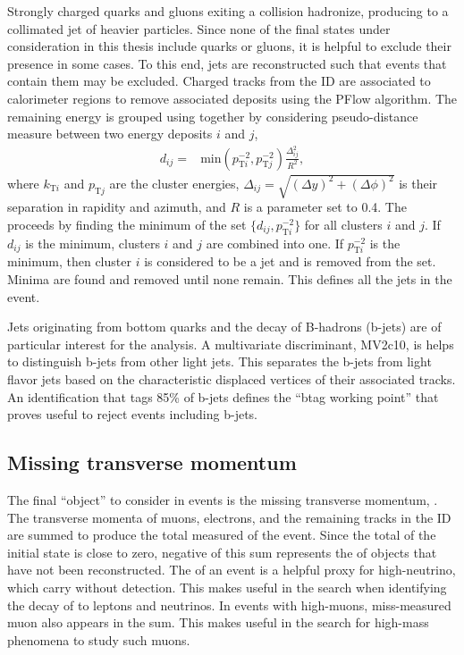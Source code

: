 Strongly charged quarks and gluons exiting a collision hadronize, producing to a collimated jet of heavier particles.
Since none of the final states under consideration in this thesis include quarks or gluons, it is helpful to exclude their presence in some cases.
To this end, jets are reconstructed such that events that contain them may be excluded.
Charged tracks from the ID are associated to calorimeter regions to remove associated deposits using the PFlow algorithm. \cite{jetReco}
The remaining energy is grouped using together by considering pseudo-distance measure between two energy deposits $i$ and $j$,
\begin{equation}\begin{split}
d_{ij} =& \text{min}(p^{-2}_{\text{T}i},p^{-2}_{\text{T}j})\frac{\Delta_{ij}^2}{R^2},
\end{split}\end{equation} 
where $k_{\text{T}i}$ and $p_{\text{T}j}$ are the cluster energies, $\Delta_{ij}=\sqrt{(\Delta y)^2+(\Delta\phi)^2}$ is their separation in rapidity and azimuth, and $R$ is a parameter set to 0.4.
The proceeds by finding the minimum of the set $\{d_{ij},p^{-2}_{\text{T}i}\}$ for all clusters $i$ and $j$. 
If $d_{ij}$ is the minimum, clusters $i$ and $j$ are combined into one.
If $p^{-2}_{\text{T}i}$ is the minimum, then cluster $i$ is considered to be a jet and is removed from the set.
Minima are found and removed until none remain.
This defines all the jets in the event. \cite{antikt}

Jets originating from bottom quarks and the decay of B-hadrons (b-jets) are of particular interest for the \hmm analysis.
A multivariate discriminant, MV2c10, is helps to distinguish b-jets from other light jets. \cite{btag}
This separates the b-jets from light flavor jets based on the characteristic displaced vertices of their associated tracks.
An identification that tags 85\% of b-jets defines the ``btag working point'' that proves useful to reject events including b-jets.

\subsection{Missing transverse momentum}

The final ``object'' to consider in events is the missing transverse momentum, \met.
The transverse momenta of muons, electrons, and the remaining tracks in the ID are summed to produce the total measured \pt of the event.
Since the total \pt of the initial state is close to zero, negative of this \pt sum represents the \pt of objects that have not been reconstructed.
The \met of an event is a helpful proxy for high-\pt neutrino, which carry \pt without detection.
This makes \met useful in the \hmm search when identifying the decay of \W to leptons and neutrinos.
In events with high-\pi muons, miss-measured muon \pt also appears in the \met sum.
This makes \met useful in the search for high-mass phenomena to study such muons.
